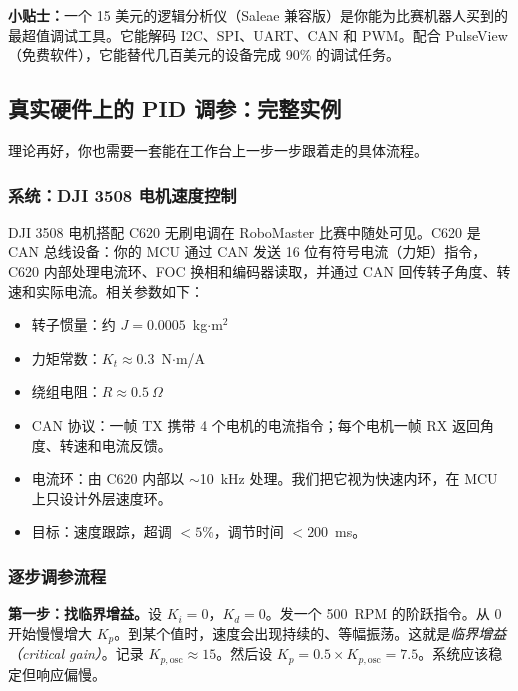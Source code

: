 \textbf{小贴士：}一个 15 美元的逻辑分析仪（Saleae 兼容版）是你能为比赛机器人买到的最超值调试工具。它能解码 I2C、SPI、UART、CAN 和 PWM。配合 PulseView（免费软件），它能替代几百美元的设备完成 90\% 的调试任务。

\subsection{真实硬件上的 PID 调参：完整实例}

理论再好，你也需要一套能在工作台上一步一步跟着走的具体流程。

\subsubsection{系统：DJI 3508 电机速度控制}

DJI 3508 电机搭配 C620 无刷电调在 RoboMaster 比赛中随处可见。C620 是 CAN 总线设备：你的 MCU 通过 CAN 发送 16 位有符号电流（力矩）指令，C620 内部处理电流环、FOC 换相和编码器读取，并通过 CAN 回传转子角度、转速和实际电流。相关参数如下：
\begin{itemize}
    \item 转子惯量：约 $J = 0.0005$~kg$\cdot$m$^2$
    \item 力矩常数：$K_t \approx 0.3$~N$\cdot$m/A
    \item 绕组电阻：$R \approx 0.5~\Omega$
    \item CAN 协议：一帧 TX 携带 4 个电机的电流指令；每个电机一帧 RX 返回角度、转速和电流反馈。
    \item 电流环：由 C620 内部以 $\sim$10~kHz 处理。我们把它视为快速内环，在 MCU 上只设计外层速度环。
    \item 目标：速度跟踪，超调 $<5\%$，调节时间 $<200$~ms。
\end{itemize}

\subsubsection{逐步调参流程}

\textbf{第一步：找临界增益。}设 $K_i = 0$，$K_d = 0$。发一个 500~RPM 的阶跃指令。从 0 开始慢慢增大 $K_p$。到某个值时，速度会出现持续的、等幅振荡。这就是\textit{临界增益（critical gain）}。记录 $K_{p,\text{osc}} \approx 15$。然后设 $K_p = 0.5 \times K_{p,\text{osc}} = 7.5$。系统应该稳定但响应偏慢。


